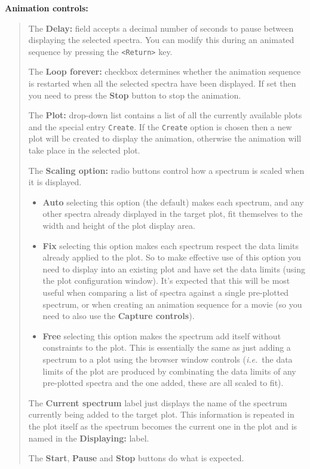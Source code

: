 \documentclass[twoside,11pt]{article}
\renewcommand{\_}{\texttt{\symbol{95}}}
\newcommand{\labelitem}[1]{\textbf{#1}}
\newcommand{\hitext}[1]{\texttt{#1}}
\newcommand{\ie}{\textit{i.e.}}
\newcommand{\subheading}[1]{\textbf{\large{#1}}}
\begin{document}
\subheading{Animation controls:}
\begin{quote}
 The \labelitem{Delay:} field accepts a decimal number of seconds to
 pause between displaying the selected spectra. You can modify this
 during an animated sequence by pressing the \hitext{<Return>} key.

 The \labelitem{Loop forever:} checkbox determines whether the
 animation sequence is restarted when all the selected spectra have
 been displayed. If set then you need to press the \labelitem{Stop}
 button to stop the animation.

 The \labelitem{Plot:} drop-down list contains a list of all the
 currently available plots and the special entry \hitext{Create}. If
 the \hitext{Create} option is chosen then a new plot will be created
 to display the animation, otherwise the animation will take place in
 the selected plot.

 The \labelitem{Scaling option:} radio buttons control how a spectrum
 is scaled when it is displayed.

 \begin{itemize}
  \item \labelitem{Auto} selecting this option (the default) makes each
  spectrum, and any other spectra already displayed in the target plot,
  fit themselves to the width and height of the plot display area.

  \item \labelitem{Fix} selecting this option makes each spectrum respect
  the data limits already applied to the plot. So to make effective use
  of this option you need to display into an existing plot and have set
  the data limits (using the plot configuration window). It's expected
  that this will be most useful when comparing a list of spectra against
  a single pre-plotted spectrum, or when creating an animation sequence
  for a movie (so you need to also use the \labelitem{Capture controls}).

  \item \labelitem{Free} selecting this option makes the spectrum add
  itself without constraints to the plot. This is essentially the same
  as just adding a spectrum to a plot using the browser window controls
  (\ie\ the data limits of the plot are produced by combinating the
  data limits of any pre-plotted spectra and the one added, these are
  all scaled to fit).
 \end{itemize}

 The \labelitem{Current spectrum} label just displays the name of the
 spectrum currently being added to the target plot. This information is
 repeated in the plot itself as the spectrum becomes the current one in
 the plot and is named in the \labelitem{Displaying:} label.

 The \labelitem{Start}, \labelitem{Pause} and \labelitem{Stop} buttons
 do what is expected.
\end{quote}
\end{document}
